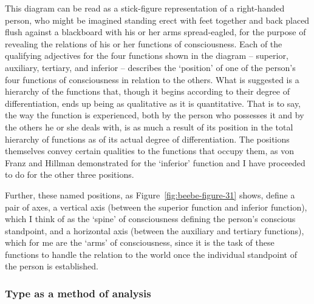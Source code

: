 \begin{itemize}
This diagram can be read as a stick-figure representation of a right-handed
person, who might be imagined standing erect with feet together and back placed
flush against a blackboard with his or her arms spread-eagled, for the purpose
of revealing the relations of his or her functions of consciousness. Each of
the qualifying adjectives for the four functions shown in the diagram --
superior, auxiliary, tertiary, and inferior -- describes the `position' of one
of the person's four functions of consciousness in relation to the others. What
is suggested is a hierarchy of the functions that, though it begins according
to their degree of differentiation, ends up being as qualitative as it is
quantitative. That is to say, the way the function is experienced, both by the
person who possesses it and by the others he or she deals with, is as much a
result of its position in the total hierarchy of functions as of its actual
degree of differentiation. The positions themselves convey certain qualities to
the functions that occupy them, as von Franz and Hillman demonstrated for the
`inferior' function and I have proceeded to do for the other three positions.

Further, these named positions, as Figure~\ref{fig:beebe-figure-31} shows,
define a pair of axes, a vertical axis (between the superior function and
inferior function), which I think of as the `spine' of consciousness defining
the person's conscious standpoint, and a horizontal axis (between the auxiliary
and tertiary functions), which for me are the `arms' of consciousness, since it
is the task of these functions to handle the relation to the world once the
individual standpoint of the person is established.

\end{itemize}

\subsubsection{Type as a method of analysis}

